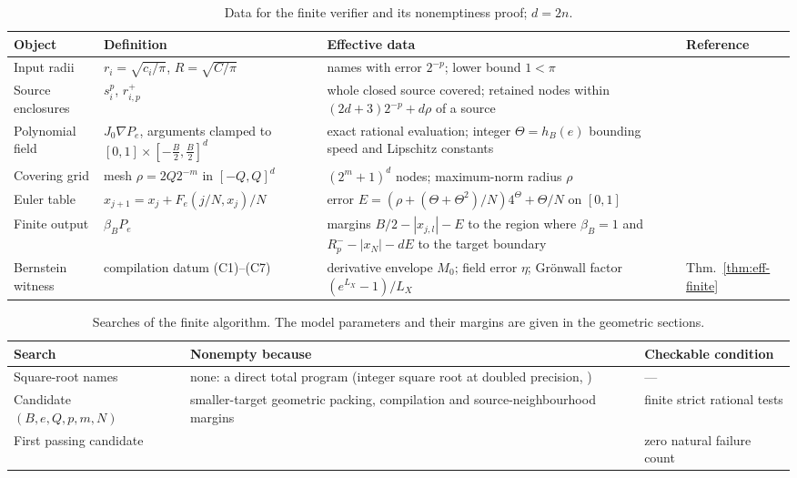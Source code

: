 \begin{table}[ht]
\centering\footnotesize
\begin{tabular}{@{}L{.18\textwidth}L{.25\textwidth}L{.33\textwidth}L{.16\textwidth}@{}}
\toprule
Object & Definition & Effective data & Reference\\
\midrule
Input radii & $r_i=\sqrt{c_i/\pi}$, $R=\sqrt{C/\pi}$ & names with error $2^{-p}$; lower bound $1<\pi$ & \\
Source enclosures & $s_i^p$, $r^+_{i,p}$ & whole closed source covered; retained nodes within $(2d+3)2^{-p}+d\rho$ of a source & \\
Polynomial field & $J_0\nabla P_e$, arguments clamped to $[0,1]\times[-\frac B2,\frac B2]^d$ & exact rational evaluation; integer $\Theta=h_B(e)$ bounding speed and Lipschitz constants & \\
Covering grid & mesh $\rho=2Q2^{-m}$ in $[-Q,Q]^d$ & $(2^m+1)^d$ nodes; maximum-norm radius $\rho$ & \\
Euler table & $x_{j+1}=x_j+F_e(j/N,x_j)/N$ & error $E=(\rho+(\Theta+\Theta^2)/N)4^\Theta+\Theta/N$ on $[0,1]$ & \\
Finite output & $\beta_BP_e$ & margins $B/2-|x_{j,l}|-E$ to the region where $\beta_B=1$ and $R^-_p-|x_N|-dE$ to the target boundary & \\
Bernstein witness & compilation datum (C1)--(C7) & derivative envelope $M_0$; field error $\eta$; Gr\"onwall factor $(e^{L_X}-1)/L_X$ & Thm.~\ref{thm:eff-finite}\\
\bottomrule
\end{tabular}
\caption{Data for the finite verifier and its nonemptiness proof; $d=2n$.}
\label{tab:eff-data}
\end{table}

\begin{table}[ht]
\centering\footnotesize
\begin{tabular}{@{}L{.26\textwidth}L{.34\textwidth}L{.31\textwidth}@{}}
\toprule
Search & Nonempty because & Checkable condition\\
\midrule
Square-root names & none: a direct total program (integer square root at doubled precision, ) & ---\\
Candidate $(B,e,Q,p,m,N)$ & smaller-target geometric packing, compilation and source-neighbourhood margins & finite strict rational tests\\
First passing candidate &  & zero natural failure count\\
\bottomrule
\end{tabular}
\caption{Searches of the finite algorithm. The model parameters and their margins are given in the geometric sections.}
\label{tab:eff-searches}
\end{table}

